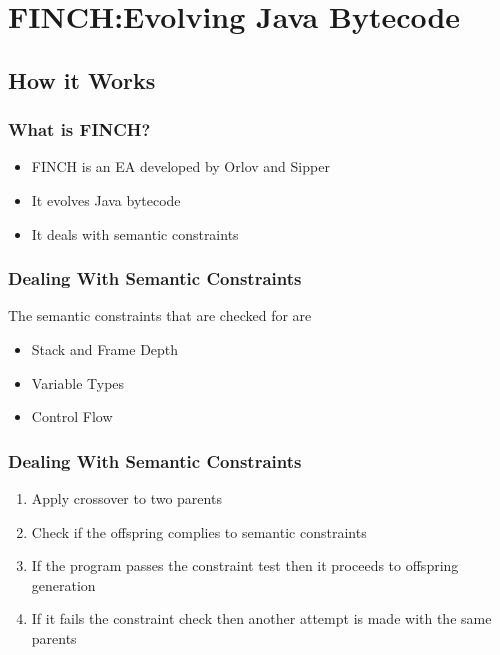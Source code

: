 \documentclass{beamer}
\begin{document}
\section[FINCH]{FINCH:Evolving Java Bytecode}

\subsection[How it works]{How it Works}
\begin{frame}
	\frametitle{What is FINCH?}
	\begin{itemize}
		\item FINCH is an EA developed by Orlov and Sipper	
		\item It evolves Java bytecode
		\item It deals with semantic constraints
	\end{itemize}
\end{frame}

\begin{frame}
  \frametitle{Dealing With Semantic Constraints}
The semantic constraints that are checked for are

	\begin{itemize}
	\item Stack and Frame Depth
	\item Variable Types
	\item Control Flow
	\end{itemize}

\end{frame}

\begin{frame}
\frametitle{Dealing With Semantic Constraints}
\begin{enumerate}
\item Apply crossover to two parents
\item Check if the offspring complies to semantic constraints
\item If the program passes the constraint test then it proceeds to offspring generation
\item If it fails the constraint check then another attempt is made with the same parents
\end{enumerate}

\end{frame}
\end{document}
